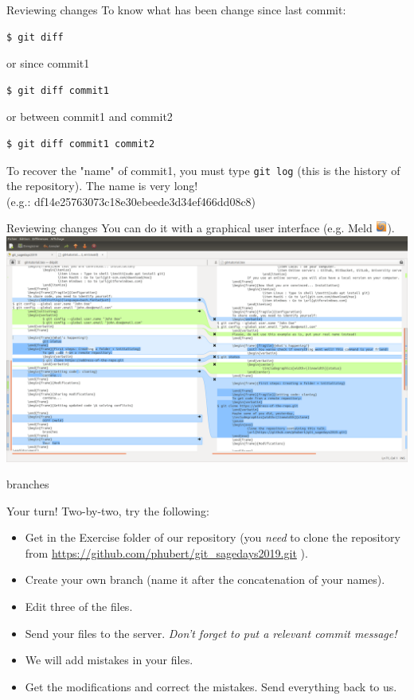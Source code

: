 \documentclass{beamer}
\begin{document}
	\begin{frame}[fragile]{Reviewing changes}
	To know what has been change since last commit:
	\begin{verbatim}
$ git diff
	\end{verbatim}
	or since commit1 
\begin{verbatim}
$ git diff commit1
\end{verbatim}
	or between commit1 and commit2
	\begin{verbatim}
$ git diff commit1 commit2
	\end{verbatim}
	\begin{tcolorbox}[colback=cyan!30]
		To recover the "name" of commit1, you must type \texttt{git log} (this is the history of the repository). The name is very long!\\
		(e.g.: df14e25763073c18e30ebeede3d34ef466dd08c8)
	\end{tcolorbox}
	\end{frame}
	\begin{frame}{Reviewing changes}
		You can do it with a graphical user interface (e.g. Meld \includegraphics[height=1em]{meld_logo}).\\
		\vspace{1em}
		\includegraphics[width=\linewidth]{meld_ps}
	\end{frame}
	\begin{frame}
		branches
	\end{frame}
	\begin{frame}{Your turn!}
	Two-by-two, try the following:
		\begin{itemize}
			\item Get in the Exercise folder of our repository (you \textit{need} to clone the repository from \url{https://github.com/phubert/git_sagedays2019.git} ).
			\item Create your own branch (name it after the concatenation of your names).
			\item Edit three of the files.
			\item Send your files to the server. \textit{Don't forget to put a relevant commit message!}
			\item We will add mistakes in your files.
			\item Get the modifications and correct the mistakes. Send everything back to us.
		\end{itemize}
	\end{frame}
\end{document}
